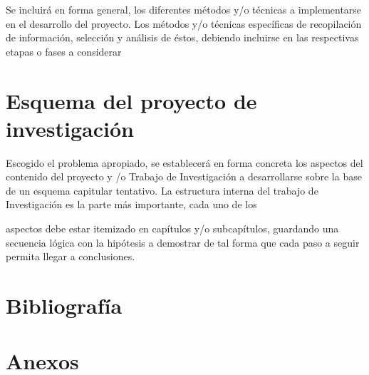 \documentclass[
  spanish,
  11pt,
  letterpaper,
  letterpaper,
  12pt]{book}
\begin{document}
Se incluirá en forma general, los diferentes métodos y/o técnicas a
implementarse en el desarrollo del proyecto. Los métodos y/o técnicas
específicas de recopilación de información, selección y análisis de
éstos, debiendo incluirse en las respectivas etapas o fases a considerar

\chapter{Esquema del proyecto de
investigación}\label{esquema-del-proyecto-de-investigaciuxf3n}

Escogido el problema apropiado, se establecerá en forma concreta los
aspectos del contenido del proyecto y /o Trabajo de Investigación a
desarrollarse sobre la base de un esquema capitular tentativo. La
estructura interna del trabajo de Investigación es la parte más
importante, cada uno de los

aspectos debe estar itemizado en capítulos y/o subcapítulos, guardando
una secuencia lógica con la hipótesis a demostrar de tal forma que cada
paso a seguir permita llegar a conclusiones.

\backmatter

\chapter{Bibliografía}\label{bibliografuxeda}

\chapter{Anexos}\label{anexos}


\backmatter
\end{document}

